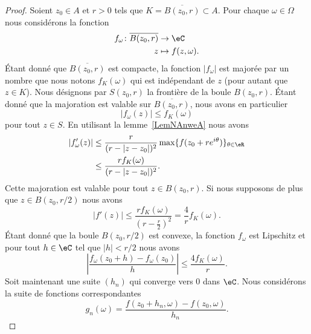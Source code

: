\begin{proof}
	Soient \( z_0\in A\) et \( r>0\) tels que \( K=\overline{ B(z_0,r) }\subset A\). Pour chaque \( \omega\in \Omega\) nous considérons la fonction
	\begin{equation}
		\begin{aligned}
			f_{\omega}\colon \overline{ B(z_0,r) } & \to \eC              \\
			z                                      & \mapsto f(z,\omega).
		\end{aligned}
	\end{equation}
	Étant donné que \( \overline{ B(z_0,r) }\) est compacte, la fonction \( | f_{\omega} |\) est majorée par un nombre que nous notons \( f_K(\omega)\) qui est indépendant de \( z\) (pour autant que $z\in K$). Nous désignons par \( S(z_0,r)\) la frontière de la boule \( B(z_0,r)\). Étant donné que la majoration est valable sur \( \overline{ B(z_0,r) }\), nous avons en particulier
	\begin{equation}
		| f_{\omega}(z) |\leq f_K(\omega)
	\end{equation}
	pour tout \( z\in S\). En utilisant la lemme~\ref{LemNAnweA} nous avons
	\begin{subequations}
		\begin{align}
			| f'_{\omega}(z) | & \leq \frac{ r }{ (r-| z-z_0 |)^2 }\max\{ f(z_0+r e^{i\theta}) \}_{\theta\in \eR} \\
			                   & \leq \frac{ rf_K(\omega) }{ (r-| z-z_0 |)^2 }.
		\end{align}
	\end{subequations}
	Cette majoration est valable pour tout \( z\in B(z_0,r)\). Si nous supposons de plus que \( z\in B(z_0,r/2)\)  nous avons
	\begin{equation}
		| f'(z) |\leq \frac{ rf_K(\omega) }{ \left( r-\frac{ r }{2} \right)^2 }=\frac{ 4 }{ r }f_K(\omega).
	\end{equation}
	Étant donné que la boule \( B(z_0,r/2)\) est convexe, la fonction \( f_{\omega}\) est Lipschitz et pour tout \( h\in \eC\) tel que \( | h |<r/2\) nous avons
	\begin{equation}
		\left| \frac{ f_{\omega}(z_0+h)-f_{\omega}(z_0) }{ h } \right| \leq \frac{ 4f_K(\omega) }{ r }.
	\end{equation}
	Soit maintenant une suite \( (h_n)\) qui converge vers \( 0\) dans \( \eC\). Nous considérons la suite de fonctions correspondantes
	\begin{equation}
		g_n(\omega)=\frac{ f(z_0+h_n,\omega)-f(z_0,\omega) }{ h_n }.

\end{equation}
\end{proof}
